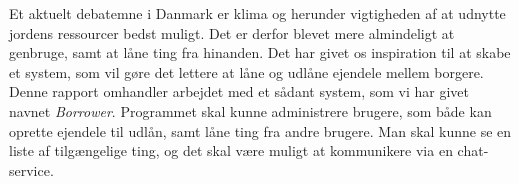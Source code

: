 

Et aktuelt debatemne i Danmark er klima og herunder vigtigheden af at udnytte jordens ressourcer bedst muligt. Det er derfor blevet mere almindeligt at genbruge, samt at låne ting fra hinanden. Det har givet os inspiration til at skabe et system, som vil gøre det lettere at låne og udlåne ejendele mellem borgere.
\newline
\noindent
Denne rapport omhandler arbejdet med et sådant system, som vi har givet navnet \textit{Borrower}. Programmet skal kunne administrere brugere, som både kan oprette ejendele til udlån, samt låne ting fra andre brugere. Man skal kunne se en liste af tilgængelige ting, og det skal være muligt at kommunikere via en chat-service. 
